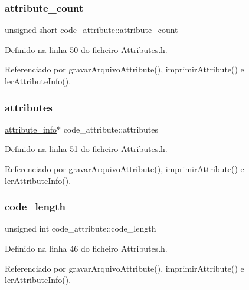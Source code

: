 \subsubsection{\texorpdfstring{attribute\+\_\+count}{attribute\_count}}
{\footnotesize\ttfamily unsigned short code\+\_\+attribute\+::attribute\+\_\+count}



Definido na linha 50 do ficheiro Attributes.\+h.



Referenciado por gravar\+Arquivo\+Attribute(), imprimir\+Attribute() e ler\+Attribute\+Info().

\mbox{\label{structcode__attribute_a9f45491da8c177e471b75c9539bb37b2}} 
\subsubsection{\texorpdfstring{attributes}{attributes}}
{\footnotesize\ttfamily \hyperlink{structattribute__info}{attribute\+\_\+info}$\ast$ code\+\_\+attribute\+::attributes}



Definido na linha 51 do ficheiro Attributes.\+h.



Referenciado por gravar\+Arquivo\+Attribute(), imprimir\+Attribute() e ler\+Attribute\+Info().

\mbox{\label{structcode__attribute_a8d9bb88d00f7285dbad08ec687adfd2c}} 
\subsubsection{\texorpdfstring{code\+\_\+length}{code\_length}}
{\footnotesize\ttfamily unsigned int code\+\_\+attribute\+::code\+\_\+length}



Definido na linha 46 do ficheiro Attributes.\+h.



Referenciado por gravar\+Arquivo\+Attribute(), imprimir\+Attribute() e ler\+Attribute\+Info().

